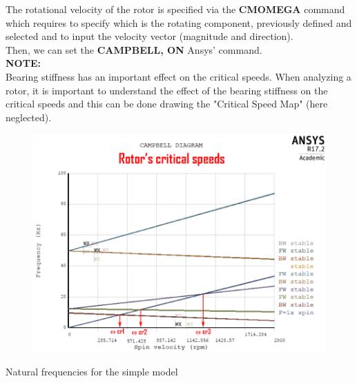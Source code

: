 \noindent
The rotational velocity of the rotor is specified via the \textbf{CMOMEGA} command which requires to specify which is the rotating component, previously defined and selected and to input the velocity vector (magnitude and direction). \\
Then, we can set the \textbf{CAMPBELL, ON} Ansys' command. \\

\noindent
\textbf{NOTE:} \\
Bearing stiffness has an important effect on the critical speeds. When analyzing a rotor, it is important to understand the effect of the bearing stiffness on the critical speeds and this can be done drawing the "Critical Speed Map" (here neglected).

\clearpage
\medskip
\begin{figure}[h]
	\begin{center}
		\centering  		 		
		\includegraphics[width=0.95\linewidth]{PICTURES/5_Rotordynamics/campbell1.png}
	\end{center}

\end{figure}







\begin{table}[h!]
	\centering
	\caption{Natural frequencies for the simple model}
	\label{tab:ModalFreq-Shellmodel}
\end{table}


